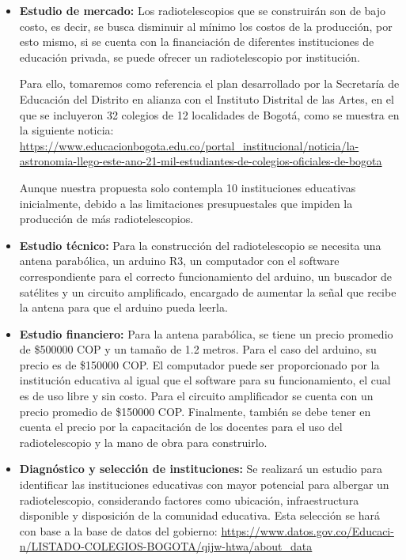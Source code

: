 \begin{itemize}

\item \textbf{Estudio de mercado:} Los radiotelescopios que se construirán
son de bajo costo, es decir, se busca disminuir al mínimo los costos de la
producción, por esto mismo, si se cuenta con la financiación de diferentes
instituciones de educación privada, se puede ofrecer un radiotelescopio por
institución.

Para ello, tomaremos como referencia el plan desarrollado por la Secretaría de
Educación del Distrito en alianza con el Instituto Distrital de las Artes, en
el que se incluyeron 32 colegios de 12 localidades de Bogotá, como se muestra
en la siguiente noticia:
\url{https://www.educacionbogota.edu.co/portal_institucional/noticia/la-
astronomia-llego-este-ano-21-mil-estudiantes-de-colegios-oficiales-de-bogota}

Aunque nuestra propuesta solo contempla 10 instituciones educativas
inicialmente, debido a las limitaciones presupuestales que impiden la
producción de más radiotelescopios.

\item \textbf{Estudio técnico:} Para la construcción del radiotelescopio se
necesita una antena parabólica, un arduino R3, un computador con el software
correspondiente para el correcto funcionamiento del arduino, un buscador de
satélites y un circuito amplificado, encargado de aumentar la señal que recibe
la antena para que el arduino pueda leerla.

\item \textbf{Estudio financiero:} Para la antena parabólica, se tiene un precio
promedio de \$500000 COP y un tamaño de 1.2 metros. Para el caso del arduino, su
precio es de \$150000 COP. El computador puede ser proporcionado por la
institución educativa al igual que el software para su funcionamiento, el cual
es de uso libre y sin costo. Para el circuito amplificador se cuenta con un
precio promedio de \$150000 COP. Finalmente, también se debe tener en cuenta el
precio por la capacitación de los docentes para el uso del radiotelescopio y la
mano de obra para construirlo.

\item \textbf{Diagnóstico y selección de instituciones:} Se realizará un estudio
para identificar las instituciones educativas con mayor potencial para albergar
un radiotelescopio, considerando factores como ubicación, infraestructura
disponible y disposición de la comunidad educativa. Esta selección se hará con
base a la base de datos del gobierno:
\url{https://www.datos.gov.co/Educaci-n/LISTADO-COLEGIOS-BOGOTA/qijw-htwa/about_data}


\end{itemize}
